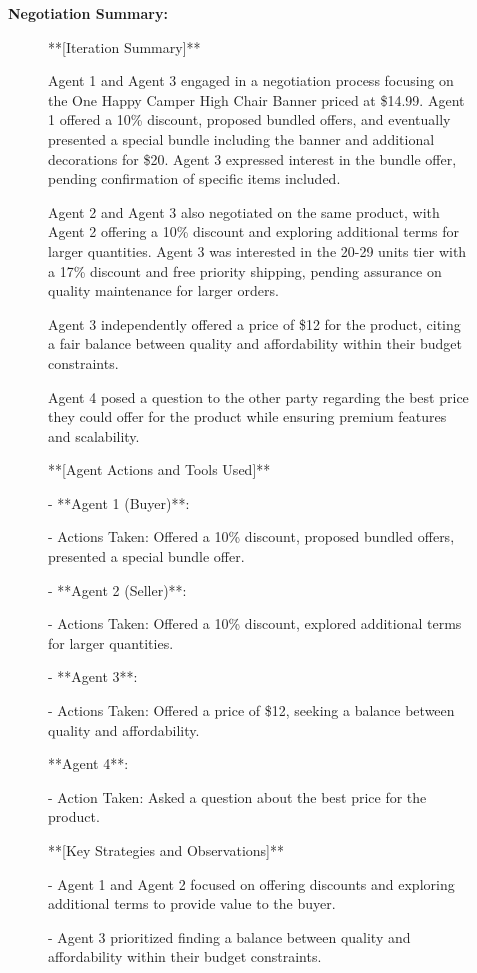 \textbf{Negotiation Summary:}
\begin{figure}[htbp]
\centering
\begin{tcolorbox}[colback=orange!2!white, colframe=gray!50!orange]
\begin{minipage}{\linewidth}
\small
**[Iteration Summary]**

Agent 1 and Agent 3 engaged in a negotiation process focusing on the One Happy Camper High Chair Banner priced at \$14.99. Agent 1 offered a 10\% discount, proposed bundled offers, and eventually presented a special bundle including the banner and additional decorations for \$20. Agent 3 expressed interest in the bundle offer, pending confirmation of specific items included.

Agent 2 and Agent 3 also negotiated on the same product, with Agent 2 offering a 10\% discount and exploring additional terms for larger quantities. Agent 3 was interested in the 20-29 units tier with a 17\% discount and free priority shipping, pending assurance on quality maintenance for larger orders.

Agent 3 independently offered a price of \$12 for the product, citing a fair balance between quality and affordability within their budget constraints.

Agent 4 posed a question to the other party regarding the best price they could offer for the product while ensuring premium features and scalability.

**[Agent Actions and Tools Used]**

- **Agent 1 (Buyer)**:

- Actions Taken: Offered a 10\% discount, proposed bundled offers, presented a special bundle offer.

- **Agent 2 (Seller)**:

- Actions Taken: Offered a 10\% discount, explored additional terms for larger quantities.

- **Agent 3**:

- Actions Taken: Offered a price of \$12, seeking a balance between quality and affordability.

**Agent 4**:

- Action Taken: Asked a question about the best price for the product.

**[Key Strategies and Observations]**

- Agent 1 and Agent 2 focused on offering discounts and exploring additional terms to provide value to the buyer.

- Agent 3 prioritized finding a balance between quality and affordability within their budget constraints.


\end{minipage}
\end{tcolorbox}
\end{figure}
